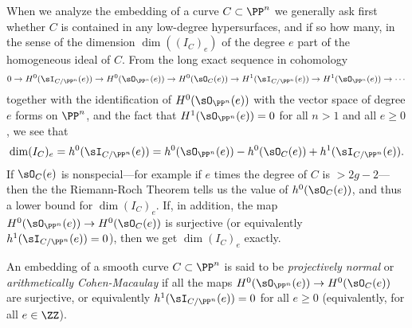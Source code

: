 When we analyze the embedding of a curve $C\subset \PP^n$ we generally ask first whether $C$ is contained in any low-degree
hypersurfaces, and if so how many, in the sense of the dimension $\dim((I_C)_e)$ of the degree $e$ part of the homogeneous ideal of $C$.
From the long exact sequence in cohomology
$$
0\to H^0(\sI_{C/\PP^n}(e)) \to H^0(\sO_{\PP^n}(e)) \to H^0(\sO_C(e)) \to H^1(\sI_{C/\PP^n}(e)) \to H^1(\sO_{\PP^n}(e)) \to\cdots
$$
together with the identification of $H^0(\sO_{\PP^n}(e))$ with the vector space of degree $e$ forms on $\PP^n$, and  the fact that
 $H^1(\sO_{\PP^n}(e)) = 0$ for all $n>1$ and all $e\geq 0$, we see that
 $$
 \dim (I_C)_e = h^0(\sI_{C/\PP^n}(e)) = h^0(\sO_{\PP^n}(e)) - h^0(\sO_C(e)) + h^1(\sI_{C/\PP^n}(e)).
$$
If $\sO_C(e)$ is nonspecial---for example if $e$ times the degree of $C$ is $>2g-2$---then the the Riemann-Roch Theorem tells us the value of
 $h^0(\sO_C(e))$, and thus a lower bound for $ \dim (I_C)_e$. If, in addition, the map
 $H^0(\sO_{\PP^n}(e)) \to H^0(\sO_C(e))$ is surjective (or equivalently $h^1(\sI_{C/\PP^n}(e))=0$),
 then we get $ \dim (I_C)_e$ exactly.
 
 
\begin{definition} An embedding of a smooth curve
$C\subset \PP^n$ is said to be \emph{projectively normal} or \emph{arithmetically Cohen-Macaulay} if all the maps $H^0(\sO_{\PP^n}(e)) \to H^0(\sO_C(e))$ are surjective,
or equivalently $h^1(\sI_{C/\PP^n}(e))=0$ for all $e\geq 0$ (equivalently, for all $e\in \ZZ$). 
\end{definition}
 
